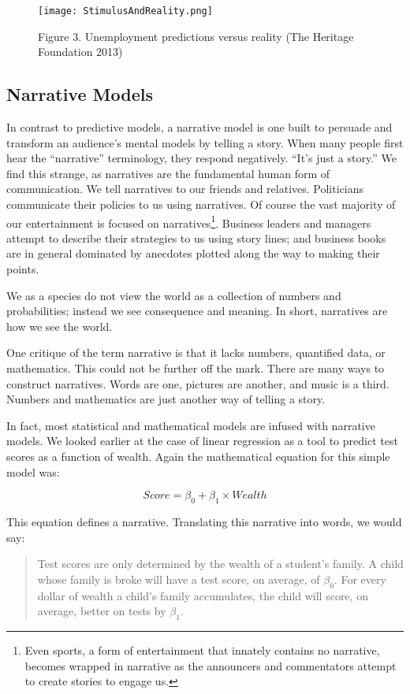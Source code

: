 \documentclass[]{memoir}
\let\Oldincludegraphics\includegraphics
\renewcommand{\includegraphics}[1]{\Oldincludegraphics[max size={\textwidth}{\textheight}]{#1}}
\begin{document}
\begin{figure}[htbp]
\centering
\texttt{[image: StimulusAndReality.png]}
\caption{Figure 3. Unemployment predictions versus reality (The Heritage
Foundation 2013)}
\end{figure}

\subsection{Narrative Models}

In contrast to predictive models, a narrative model is one built to
persuade and transform an audience's mental models by telling a story.
When many people first hear the ``narrative'' terminology, they respond
negatively. ``It's just a story.'' We find this strange, as narratives
are the fundamental human form of communication. We tell narratives to
our friends and relatives. Politicians communicate their policies to us
using narratives. Of course the vast majority of our entertainment is
focused on narratives\footnote{Even sports, a form of entertainment that
  innately contains no narrative, becomes wrapped in narrative as the
  announcers and commentators attempt to create stories to engage us.}.
Business leaders and managers attempt to describe their strategies to us
using story lines; and business books are in general dominated by
anecdotes plotted along the way to making their points.

We as a species do not view the world as a collection of numbers and
probabilities; instead we see consequence and meaning. In short,
narratives are how we see the world.

One critique of the term narrative is that it lacks numbers, quantified
data, or mathematics. This could not be further off the mark. There are
many ways to construct narratives. Words are one, pictures are another,
and music is a third. Numbers and mathematics are just another way of
telling a story.

In fact, most statistical and mathematical models are infused with
narrative models. We looked earlier at the case of linear regression as
a tool to predict test scores as a function of wealth. Again the
mathematical equation for this simple model was:

\[ Score = \beta_0 + \beta_1 \times Wealth \]

This equation defines a narrative. Translating this narrative into
words, we would say:

\begin{quote}
Test scores are only determined by the wealth of a student's family. A
child whose family is broke will have a test score, on average, of
$\beta_0$. For every dollar of wealth a child's family accumulates, the
child will score, on average, better on tests by $\beta_1$.
\end{quote}
\end{document}
